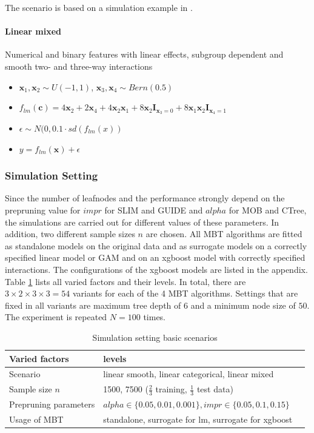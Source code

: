The scenario is based on a simulation example in \citep{Herbinger.2022}.

\paragraph{Linear mixed}
Numerical and binary features with linear effects, subgroup dependent and smooth two- and three-way interactions
\begin{itemize}
    \item $\textbf{x}_1, \textbf{x}_2 \sim U(-1,1)$, $\textbf{x}_3, \textbf{x}_4 \sim Bern(0.5)$
    \item $f_{lm}(\textbf{c}) = 4   \textbf{x}_2 + 2   \textbf{x}_4  + 4   \textbf{x}_2   \textbf{x}_1 + 8   \textbf{x}_2   \mathbf{I}_{\textbf{x}_3 = 0} +  8 \textbf{x}_1   \textbf{x}_2 \mathbf{I}_{\textbf{x}_4 = 1}$
    \item $\epsilon \sim N(0, 0.1 \cdot sd(f_{lm}(x))$
    \item $y = f_{lm}(\textbf{x}) + \epsilon$
\end{itemize}



\subsubsection{Simulation Setting}
Since the number of leafnodes and the performance strongly depend on the prepruning value for $impr$ for SLIM and GUIDE and $alpha$ for MOB and CTree, the simulations are carried out for different values of these parameters. In addition, two different sample sizes $n$ are chosen. 
All MBT algorithms are fitted as standalone models on the original data and as surrogate models on a correctly specified linear model or GAM and on an xgboost model with correctly specified interactions. The configurations of the xgboost models are listed in the appendix.
Table \ref{tab:simulation_setting} lists all varied factors and their levels. In total, there are $3 \times 2 \times 3 \times 3 = 54$ variants for each of the 4 MBT algorithms.
Settings that are fixed in all variants are maximum tree depth of $6$ and a minimum node size of $50$.
The experiment is repeated $N = 100$ times.

\begin{table}[!htb] 

\caption{Simulation setting basic scenarios}
\centering \small
\begin{tabular}[t]{lll}
\hline
Varied factors & levels \\
\hline
Scenario  & linear smooth, linear categorical, linear mixed\\
Sample size $n$  & 1500, 7500 ($\frac{2}{3}$  training, $\frac{1}{3}$ test data)\\
Prepruning parameters   & $alpha \in \{0.05,0.01,0.001\}, impr \in \{0.05,0.1,0.15\}$ \\
Usage of MBT  & standalone, surrogate for lm, surrogate for xgboost \\ 
\hline
\end{tabular}
\label{tab:simulation_setting}
\end{table}

